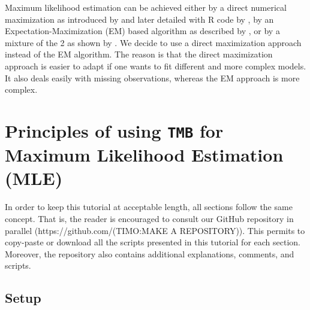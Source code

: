 \documentclass[bimj,fleqn]{w-art}\usepackage[]{graphicx}\usepackage[]{color}
\theoremstyle{plain}
\theoremstyle{definition}
\begin{document}
Maximum likelihood estimation can be achieved either by a direct numerical maximization as introduced by \citet{turner} and later detailed with R code by \citet{zucchini}, by an Expectation-Maximization (EM) based algorithm as described by \citet{bauma}, or by a mixture of the 2 as shown by \citet{bulla}.
We decide to use a direct maximization approach instead of the EM algorithm.
The reason is that the direct maximization approach is easier to adapt if one wants to fit different and more complex models.
It also deals easily with missing observations, whereas the EM approach is more complex.

% 



\section{Principles of using {\tt{TMB}} for Maximum Likelihood Estimation (MLE)}
\label{sec:principles}

In order to keep this tutorial at acceptable length, all sections follow the same concept.
That is, the reader is encouraged to consult our GitHub repository in parallel (https://github.com/(TIMO:MAKE A REPOSITORY)).
This permits to copy-paste or download all the scripts presented in this tutorial for each section.
Moreover, the repository also contains additional explanations, comments, and scripts.



\subsection{Setup}
\label{sec:setup}
\end{document}
